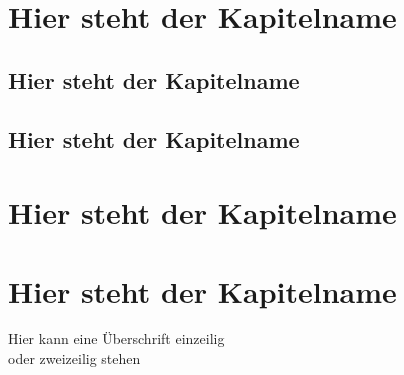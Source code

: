 \documentclass[aspectratio=169, table]{beamer}
\begin{document}
\section{Hier steht der Kapitelname}
\subsection{Hier steht der Kapitelname}
\subsection{Hier steht der Kapitelname}

\section{Hier steht der Kapitelname}
\section{Hier steht der Kapitelname}

\begin{frame}{Hier kann eine Überschrift einzeilig\\oder zweizeilig stehen}
	\blindtext
\end{frame}
\end{document}
